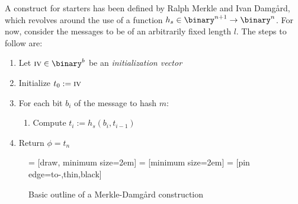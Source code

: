 A construct for starters has been defined by Ralph Merkle and Ivan Damg\r{a}rd, which revolves around the use of a \crh{} function $h_s \in \binary^{n + 1} \to \binary^n$. For now, consider the messages to be of an arbitrarily fixed length $l$. The steps to follow are:

\begin{enumerate}
    \item Let $\textsc{iv} \in \binary^b$ be an \emph{initialization vector}
    \item Initialize $t_0 := \textsc{iv}$
    \item For each bit $b_i$ of the message to hash $m$:
    \begin{enumerate}
        \item Compute $t_i := h_s(b_i, t_{i - 1})$
    \end{enumerate}
    \item Return $\phi = t_n$
\end{enumerate}



\begin{figure}
    \centering

       = [draw, minimum size=2em]
     = [minimum size=2em]
      = [pin edge={to-,thin,black}]

    \caption{Basic outline of a Merkle-Damg\r{a}rd construction}
    \label{fig:mdbase}
\end{figure}

